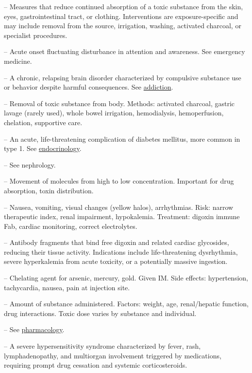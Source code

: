 -- Measures that reduce continued absorption of a toxic substance from the skin, eyes, gastrointestinal tract, or clothing. Interventions are exposure-specific and may include removal from the source, irrigation, washing, activated charcoal, or specialist procedures.

-- Acute onset fluctuating disturbance in attention and awareness. See emergency medicine.

-- A chronic, relapsing brain disorder characterized by compulsive substance use or behavior despite harmful consequences. See \hyperlink{Addiction}{addiction}.

-- Removal of toxic substance from body. Methods: activated charcoal, gastric lavage (rarely used), whole bowel irrigation, hemodialysis, hemoperfusion, chelation, supportive care.

-- An acute, life-threatening complication of diabetes mellitus, more common in type 1. See \hyperlink{Endocrinology}{endocrinology}.

-- See nephrology.

-- Movement of molecules from high to low concentration. Important for drug absorption, toxin distribution.

-- Nausea, vomiting, visual changes (yellow halos), arrhythmias. Risk: narrow therapeutic index, renal impairment, hypokalemia. Treatment: digoxin immune Fab, cardiac monitoring, correct electrolytes.

-- Antibody fragments that bind free digoxin and related cardiac glycosides, reducing their tissue activity. Indications include life-threatening dysrhythmia, severe hyperkalemia from acute toxicity, or a potentially massive ingestion.

-- Chelating agent for arsenic, mercury, gold. Given IM. Side effects: hypertension, tachycardia, nausea, pain at injection site.

-- Amount of substance administered. Factors: weight, age, renal/hepatic function, drug interactions. Toxic dose varies by substance and individual.

-- See \hyperlink{Pharmacology}{pharmacology}.

-- A severe hypersensitivity syndrome characterized by fever, rash, lymphadenopathy, and multiorgan involvement triggered by medications, requiring prompt drug cessation and systemic corticosteroids.

